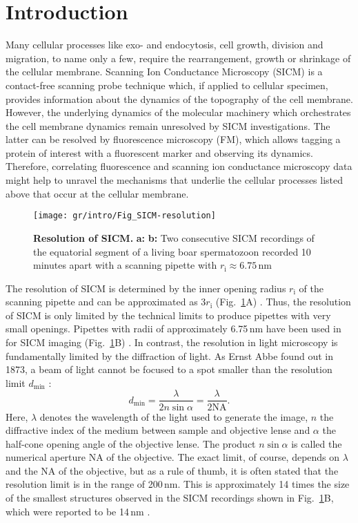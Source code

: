\section{Introduction}
\label{sec:introduction}
Many cellular processes like exo- and endocytosis, cell growth, division and
migration, to name only a few, require the rearrangement, growth or shrinkage
of the cellular membrane. Scanning Ion Conductance Microscopy (SICM)
\cite{Hansma1989} is a contact-free scanning probe technique which, if applied
to cellular specimen, provides information about the dynamics of the
topography of the cell membrane. However, the underlying dynamics of the
molecular machinery which orchestrates the cell membrane dynamics remain
unresolved by SICM investigations. The latter can be resolved by fluorescence
microscopy (FM), which allows tagging a protein of interest with a fluorescent
marker and observing its dynamics. Therefore, correlating fluorescence and
scanning ion conductance microscopy data might help to unravel the mechanisms
that underlie the cellular processes listed above that occur at the cellular
membrane.

\begin{figure}
  \sidecaption[t]
  \texttt{[image: gr/intro/Fig\_SICM-resolution]}
  \caption{\textbf{Resolution of SICM.} \textbf{a:} \textbf{b:} Two
    consecutive SICM recordings of the equatorial segment of a living boar
    spermatozoon recorded 10 minutes apart with a scanning pipette with
    $r_\mathrm{i} \approx 6.75\,\text{nm}$}
  \label{fig:sicm-resolution}
\end{figure}
  
The resolution of SICM is determined by the inner opening radius
$r_\mathrm{i}$ of the scanning pipette and can be approximated as
$3r_\mathrm{i}$ (Fig.~\ref{fig:sicm-resolution}A)
\cite{rheinlaender:094905,Rheinlaender2015}.  Thus, the resolution of SICM is
only limited by the technical limits to produce pipettes with very small
openings. Pipettes with radii of approximately 6.75\,nm have been used in for
SICM imaging (Fig.~\ref{fig:sicm-resolution}B) \cite{Shevchuk2008}. In
contrast, the resolution in light microscopy is fundamentally limited by the
diffraction of light. As Ernst Abbe found out in 1873, a beam of light cannot
be focused to a spot smaller than the resolution limit $d_\text{min}$
\cite{Abbe1873}:
\begin{equation}
  d_\text{min} = \frac\lambda{2n\sin\alpha} = \frac\lambda{2\mathrm{NA}}\text{.}
  \label{eq:diffraction-limit}
\end{equation}
Here, $\lambda$ denotes the wavelength of the light used to generate the
image, $n$ the diffractive index of the medium between sample and objective
lense and $\alpha$ the half-cone opening angle of the objective lense. The
product $n\sin\alpha$ is called the numerical aperture $\mathrm{NA}$ of the
objective. The exact limit, of course, depends on $\lambda$ and the NA of the
objective, but as a rule of thumb, it is often stated that the resolution
limit is in the range of 200\,nm. This is approximately 14 times the size of
the smallest structures observed in the SICM recordings shown in
Fig.~\ref{fig:sicm-resolution}B, which were reported to be 14\,nm
\cite{Shevchuk2008}.

